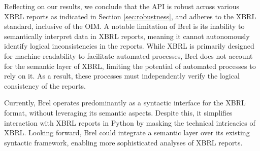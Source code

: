 Reflecting on our results, we conclude that the API is robust across various XBRL reports
as indicated in Section \ref{sec:robustness},
and adheres to the XBRL standard, inclusive of the OIM.
A notable limitation of Brel is its inability to semantically interpret data in XBRL reports,
meaning it cannot autonomously identify logical inconsistencies in the reports.
While XBRL is primarily designed for machine-readability to facilitate automated processes,
Brel does not account for the semantic layer of XBRL, limiting the potential of automated processes to rely on it.
As a result, these processes must independently verify the logical consistency of the reports.

Currently, Brel operates predominantly as a syntactic interface for the XBRL format, without leveraging its semantic aspects.
Despite this, it simplifies interaction with XBRL reports in Python by masking the technical intricacies of XBRL.
Looking forward, Brel could integrate a semantic layer over its existing syntactic framework, enabling more sophisticated analyses of XBRL reports.

